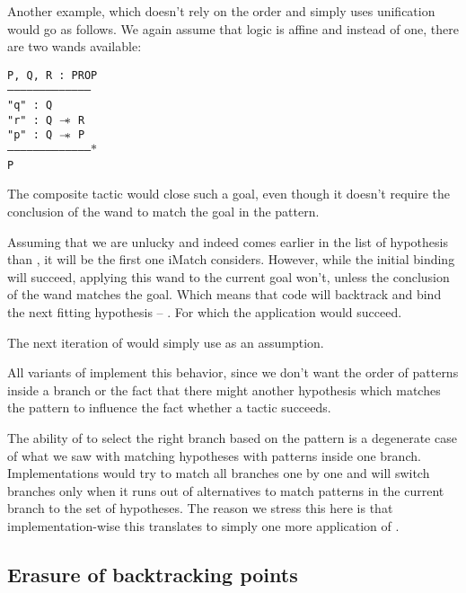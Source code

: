 Another example, which doesn't rely on the order and simply uses unification would go as follows.
We again assume that logic is affine and instead of one, there are two wands available:

\begin{minipage}{\linewidth}
\texttt{P, Q, R : PROP\\
---------------------------------------\\
"q" : Q\\
"r" : Q $\mathrel{-\mkern-6mu*}$ R\\
"p" : Q $\mathrel{-\mkern-6mu*}$ P\\
--------------------------------------$\ast$\\
P
}
\end{minipage}

The composite tactic  would close such a goal, even though it doesn't require the conclusion of the wand to match the goal in the pattern.

Assuming that we are unlucky and  indeed comes earlier in the list of hypothesis than , it will be the first one iMatch considers.
However, while the initial binding will succeed, applying this wand to the current goal won't, unless the conclusion of the wand matches the goal.
Which means that code will backtrack and bind the next fitting hypothesis -- .
For which the application would succeed.

The next iteration of  would simply use  as an assumption.

All variants of  implement this behavior, since we don't want the order of patterns inside a branch or the fact that there might another hypothesis which matches the pattern to influence the fact whether a tactic succeeds.

The ability of  to select the right branch based on the pattern is a degenerate case of what we saw with matching hypotheses with patterns inside one branch.
Implementations would try to match all branches one by one and will switch branches only when it runs out of alternatives to match patterns in the current branch to the set of hypotheses.
The reason we stress this here is that implementation-wise this translates to simply one more application of .

\subsection{Erasure of backtracking points}

